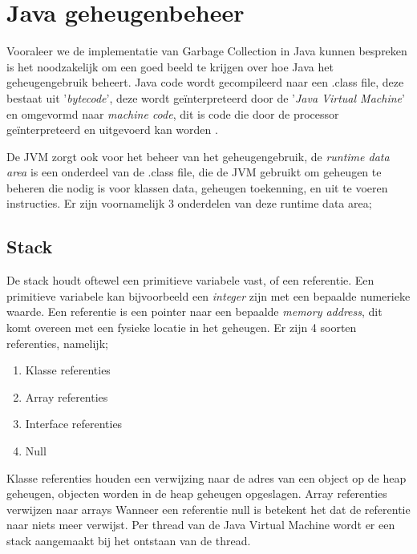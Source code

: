 \section{Java geheugenbeheer}
\label{sec:java geheugenbeheer}
Vooraleer we de implementatie van Garbage Collection in Java kunnen bespreken is het noodzakelijk om een goed beeld te krijgen over hoe Java het geheugengebruik beheert.
Java code wordt gecompileerd naar een .class file, deze bestaat uit '\textit{bytecode}', deze wordt geïnterpreteerd door de '\textit{Java Virtual Machine}' en omgevormd naar \textit{machine code}, dit is code die door de processor geïnterpreteerd en uitgevoerd kan worden .

De JVM zorgt ook voor het beheer van het geheugengebruik, de \textit{runtime data area} is een onderdeel van de .class file, die de JVM gebruikt om geheugen te beheren die nodig is voor klassen data, geheugen toekenning, en uit te voeren instructies.\autocite{Putten2022}
Er zijn voornamelijk 3 onderdelen van deze runtime data area;

\subsection{Stack}
\label{sec:Stack}

De stack houdt oftewel een primitieve variabele vast, of een referentie.
Een primitieve variabele kan bijvoorbeeld een \textit{integer} zijn met een bepaalde numerieke waarde.
Een referentie is een pointer naar een bepaalde \textit{memory address}, dit komt overeen met een fysieke locatie in het geheugen.\autocite{Huck1993}
Er zijn 4 soorten referenties, namelijk;
\begin{enumerate}
    \item Klasse referenties
    \item Array referenties
    \item Interface referenties
    \item Null
\end{enumerate}
Klasse referenties houden een verwijzing naar de adres van een object op de heap geheugen, objecten worden in de heap geheugen opgeslagen.
Array referenties verwijzen naar arrays
Wanneer een referentie null is betekent het dat de referentie naar niets meer verwijst.
Per thread van de Java Virtual Machine wordt er een stack aangemaakt bij het ontstaan van de thread.
 

